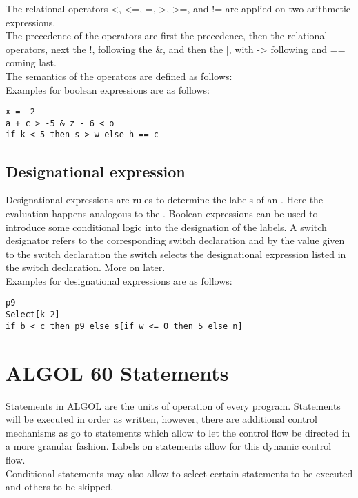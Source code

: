 \documentclass{article}
\begin{document}
The relational operators <, <=, =, >, >=, and != are applied on two arithmetic expressions. \\

The precedence of the operators are first the \label{arithexptypes} precedence, then the relational operators, next the !, following the \&, and then the |, with -\textgreater{} following and == coming last.\\
The semantics of the operators are defined as follows:\\
Examples for boolean expressions are as follows:\\

\begin{lstlisting}[language={[60]algol}]
x = -2
a + c > -5 & z - 6 < o
if k < 5 then s > w else h == c
\end{lstlisting}

\subsection{Designational expression} \label{desigExp}
Designational expressions are rules to determine the labels of an . Here the evaluation happens analogous to the . Boolean expressions can be used to introduce some conditional logic into the designation of the labels. A switch designator refers to the corresponding switch declaration and by the value given to the switch declaration the switch selects the designational expression listed in the switch declaration. More on  later.\\
Examples for designational expressions are as follows:\\

\begin{lstlisting}[language={[60]algol}]
p9
Select[k-2]
if b < c then p9 else s[if w <= 0 then 5 else n]
\end{lstlisting}

\newpage

\section{ALGOL 60 Statements} \label{statement}
Statements in ALGOL are the units of operation of every program. Statements will be executed in order as written, however, there are additional control mechanisms as go to statements which allow to let the control flow be directed in a more granular fashion. Labels on statements allow for this dynamic control flow.\\
Conditional statements may also allow to select certain statements to be executed and others to be skipped.\\
\end{document}

